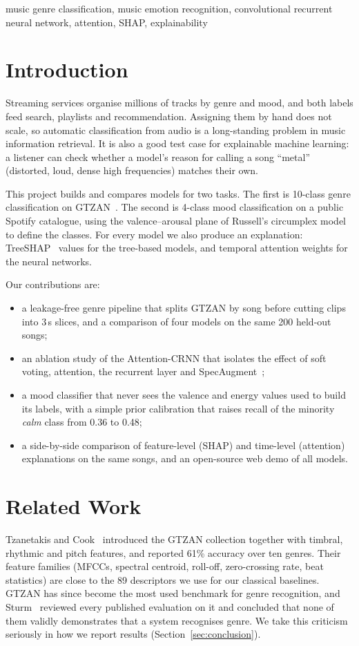 \documentclass[conference]{IEEEtran}
\begin{document}
\begin{IEEEkeywords}
music genre classification, music emotion recognition, convolutional recurrent neural network, attention, SHAP, explainability
\end{IEEEkeywords}

\section{Introduction}
Streaming services organise millions of tracks by genre and mood, and both labels feed search, playlists and recommendation. Assigning them by hand does not scale, so automatic classification from audio is a long-standing problem in music information retrieval. It is also a good test case for explainable machine learning: a listener can check whether a model's reason for calling a song ``metal'' (distorted, loud, dense high frequencies) matches their own.

This project builds and compares models for two tasks. The first is 10-class genre classification on GTZAN~\cite{tzanetakis2002}. The second is 4-class mood classification on a public Spotify catalogue, using the valence--arousal plane of Russell's circumplex model~\cite{russell1980} to define the classes. For every model we also produce an explanation: TreeSHAP~\cite{lundberg2020} values for the tree-based models, and temporal attention weights for the neural networks.

Our contributions are:
\begin{itemize}
\item a leakage-free genre pipeline that splits GTZAN by song before cutting clips into 3\,s slices, and a comparison of four models on the same 200 held-out songs;
\item an ablation study of the Attention-CRNN that isolates the effect of soft voting, attention, the recurrent layer and SpecAugment~\cite{park2019};
\item a mood classifier that never sees the valence and energy values used to build its labels, with a simple prior calibration that raises recall of the minority \emph{calm} class from 0.36 to 0.48;
\item a side-by-side comparison of feature-level (SHAP) and time-level (attention) explanations on the same songs, and an open-source web demo of all models.
\end{itemize}

\section{Related Work}
Tzanetakis and Cook~\cite{tzanetakis2002} introduced the GTZAN collection together with timbral, rhythmic and pitch features, and reported 61\% accuracy over ten genres. Their feature families (MFCCs, spectral centroid, roll-off, zero-crossing rate, beat statistics) are close to the 89 descriptors we use for our classical baselines. GTZAN has since become the most used benchmark for genre recognition, and Sturm~\cite{sturm2014} reviewed every published evaluation on it and concluded that none of them validly demonstrates that a system recognises genre. We take this criticism seriously in how we report results (Section~\ref{sec:conclusion}).
\end{document}
